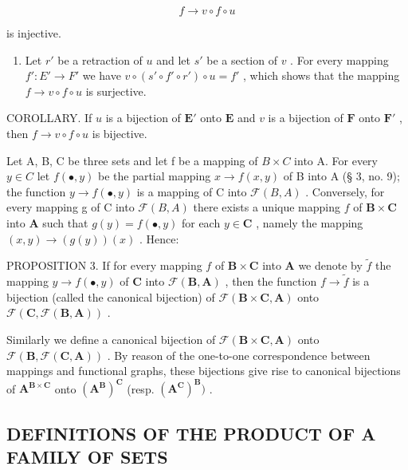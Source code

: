 \[
f \rightarrow v \circ f \circ u
\]

is injective.

\begin{enumerate}
\def\labelenumi{(\arabic{enumi})}
\setcounter{enumi}{1}
\tightlist
\item
  Let \(r'\) be a retraction of \(u\) and let \(s'\) be a section of \(v\) . For every mapping \(f': E' \to F'\) we have \(v \circ (s' \circ f' \circ r') \circ u = f'\) , which shows that the mapping \(f \to v \circ f \circ u\) is surjective.
\end{enumerate}

COROLLARY. If \(u\) is a bijection of \(\mathbf{E}'\) onto \(\mathbf{E}\) and \(v\) is a bijection of \(\mathbf{F}\) onto \(\mathbf{F}'\) , then \(f \to v \circ f \circ u\) is bijective.

Let A, B, C be three sets and let f be a mapping of \(B \times C\) into A. For every \(y \in C\) let \(f(\bullet, y)\) be the partial mapping \(x \to f(x, y)\) of B into A (§ 3, no. 9); the function \(y \to f(\bullet, y)\) is a mapping of C into \(\mathcal{F}(B, A)\) . Conversely, for every mapping g of C into \(\mathcal{F}(B, A)\) there exists a unique mapping \(f\) of \(\mathbf{B} \times \mathbf{C}\) into \(\mathbf{A}\) such that \(g(y) = f(\bullet, y)\) for each \(y \in \mathbf{C}\) , namely the mapping \((x, y) \to (g(y))(x)\) . Hence:

PROPOSITION 3. If for every mapping \(f\) of \(\mathbf{B} \times \mathbf{C}\) into \(\mathbf{A}\) we denote by \(\tilde{f}\) the mapping \(y \to f(\bullet, y)\) of \(\mathbf{C}\) into \(\mathcal{F}(\mathbf{B}, \mathbf{A})\) , then the function \(f \to \tilde{f}\) is a bijection (called the canonical bijection) of \(\mathcal{F}(\mathbf{B} \times \mathbf{C}, \mathbf{A})\) onto \(\mathcal{F}(\mathbf{C}, \mathcal{F}(\mathbf{B}, \mathbf{A}))\) .

Similarly we define a canonical bijection of \(\mathcal{F}(\mathbf{B}\times\mathbf{C},\mathbf{A})\) onto \(\mathcal{F}(\mathbf{B},\mathcal{F}(\mathbf{C},\mathbf{A}))\) . By reason of the one-to-one correspondence between mappings and functional graphs, these bijections give rise to canonical bijections of \(\mathbf{A}^{\mathbf{B}\times\mathbf{C}}\) onto \((\mathbf{A}^{\mathbf{B}})^{\mathbf{C}}\) (resp. \((\mathbf{A}^{\mathbf{C}})^{\mathbf{B}})\) .

\subsection{DEFINITIONS OF THE PRODUCT OF A FAMILY OF SETS}

